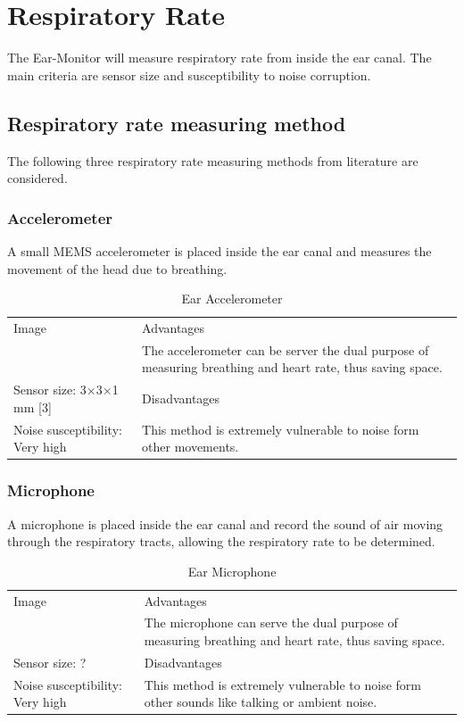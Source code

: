 \section{Respiratory Rate}
The Ear-Monitor will measure respiratory rate from inside the ear canal. The main criteria are sensor size and susceptibility to noise corruption.

\subsection{Respiratory rate measuring method}
The following three respiratory rate measuring methods from literature are considered.

\subsubsection{Accelerometer}
A small MEMS accelerometer is placed inside the ear canal and measures the movement of the head due to breathing.

\begin{table}[H]
\caption{Ear Accelerometer}
\label{tab:EarAccelerometer_Eval}
\renewcommand{\arraystretch}{1.3}	%
\centering
\begin{tabular}{|p{5cm}|p{8cm}|} 
 \hline
 Image 		& 	Advantages  \\ 
  			&	\tabitem The accelerometer can be server the dual purpose of measuring breathing and heart rate, thus saving space.\\
\hline
Sensor size: 3$\times$3$\times$1 mm	[3]					&	Disadvantages  \\ 
Noise susceptibility: Very high							&	\tabitem This method is extremely vulnerable to noise form other movements.\\
 \hline
\end{tabular}
\end{table}

\subsubsection{Microphone}
A microphone is placed inside the ear canal and record the sound of air moving through the respiratory tracts, allowing the respiratory rate to be determined.

\begin{table}[H]
\caption{Ear Microphone}
\label{tab:EarMicrophone_Eval}
\renewcommand{\arraystretch}{1.3}	%
\centering
\begin{tabular}{|p{5cm}|p{8cm}|} 
 \hline
 Image 		& 	Advantages  \\ 
  			&	\tabitem The microphone can serve the dual purpose of measuring breathing and heart rate, thus saving space.\\
\hline
Sensor size: ?					&	Disadvantages  \\ 
Noise susceptibility: Very high	&	\tabitem This method is extremely vulnerable to noise form other sounds like talking or ambient noise.\\
 \hline
\end{tabular}
\end{table}

